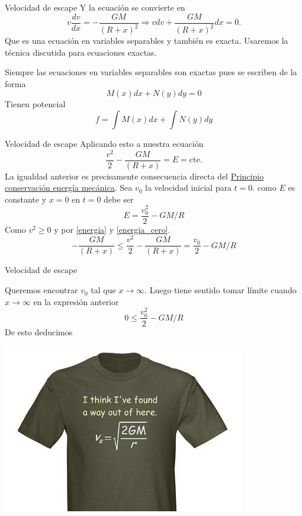 \documentclass[handout,hyperref={colorlinks=true}]{beamer}
\begin{document}
\begin{frame}{Velocidad de escape}
Y la ecuación se convierte en
\[v\frac{dv}{dx}=-\frac{GM}{(R+x)^2}\Longrightarrow vdv+\frac{GM}{(R+x)^2}dx=0.\]
Que es una ecuación en variables separables y también es exacta. Usaremos la técnica discutida para 
ecuaciones exactas. 

Siempre las ecuaciones en variables separables son exactas pues se escriben de la forma
\[M(x)dx+N(y)dy=0\]
Tienen potencial
\[f=\int M(x)dx +\int N(y)dy\]


\end{frame}

\begin{frame}{Velocidad de escape}
Aplicando esto a nuestra ecuación
\begin{equation}\label{energia}
 \frac{v^2}{2}-\frac{GM}{(R+x)}=E=\text{cte}.
\end{equation}
  La igualdad anterior es precisamente 
 consecuencia directa del \href{https://docs.google.com/file/d/0B80iJ0HgObRRWll6MlJFSjFNMGc/edit}{Principio conservación energía mecánica}.
Sea $v_0$ la velocidad inicial para $t=0$. como $E$ es constante y $x=0$ en $t=0$ debe ser 
\begin{equation}\label{energia_cero}
 E=\frac{v_0^2}{2}-GM/R
\end{equation}
Como $v^2\geq 0$ y por \eqref{energia} y \eqref{energia_cero}.
\[-\frac{GM}{(R+x)}\leq\frac{v^2}{2}-\frac{GM}{(R+x)}=\frac{v_0}{2}-GM/R\]
 

\end{frame}

\begin{frame}{Velocidad de escape}
 
\onslide<+-> Queremos encontrar $v_0$ tal que $x\to\infty$. Luego tiene sentido tomar límite cuando $x\to\infty$ en la expresión anterior 
\[0\leq \frac{v_0^2}{2}-GM/R\]
\onslide<+-> De esto deducimos 

\begin{center}
 \includegraphics[scale=.4]{imagenes/velocidad_escape.jpg}
\end{center}

\end{frame}
\end{document}
